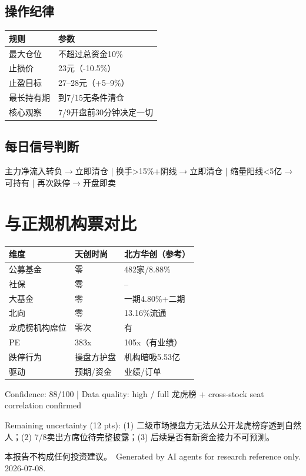 \documentclass[a4paper,11pt,fontset=none]{ctexart}
\newcommand{\reportdisclaimer}{本报告不构成任何投资建议。}
\begin{document}
\subsection*{操作纪律}

\begin{tabularx}{\textwidth}{L{3.5cm}X}
\toprule
\textbf{规则} & \textbf{参数} \\
\midrule
最大仓位 & 不超过总资金10\% \\
止损价 & 23元（-10.5\%） \\
止盈目标 & 27--28元（+5--9\%） \\
最长持有期 & 到7/15无条件清仓 \\
核心观察 & 7/9开盘前30分钟决定一切 \\
\bottomrule
\end{tabularx}

\subsection*{每日信号判断}

主力净流入转负$\to$立即清仓 | 换手>15\%+阴线$\to$立即清仓 | 缩量阳线<5亿$\to$可持有 | 再次跌停$\to$开盘即卖

\section{与正规机构票对比}

\begin{tabularx}{\textwidth}{L{3cm}L{4cm}L{4cm}}
\toprule
\textbf{维度} & \textbf{天创时尚} & \textbf{北方华创（参考）} \\
\midrule
公募基金 & 零 & 482家/8.88\% \\
社保 & 零 & -- \\
大基金 & 零 & 一期4.80\%+二期 \\
北向 & 零 & 13.16\%流通 \\
龙虎榜机构席位 & 零次 & 有 \\
PE & 383x & 105x（有业绩） \\
跌停行为 & 操盘方护盘 & 机构暗吸5.53亿 \\
驱动 & 预期/资金 & 业绩/订单 \\
\bottomrule
\end{tabularx}

\vfill
\begin{disclosurebox}[Metadata]
\footnotesize
Confidence: 88/100 \quad | \quad
Data quality: high / full 龙虎榜 + cross-stock seat correlation confirmed

\vspace{0.3em}
Remaining uncertainty (12 pts): (1) 二级市场操盘方无法从公开龙虎榜穿透到自然人；(2) 7/8卖出方席位待完整披露；(3) 后续是否有新资金接力不可预测。

\vspace{0.4em}
{\tiny\reportdisclaimer\ Generated by AI agents for research reference only. 2026-07-08.}
\end{disclosurebox}
\end{document}
